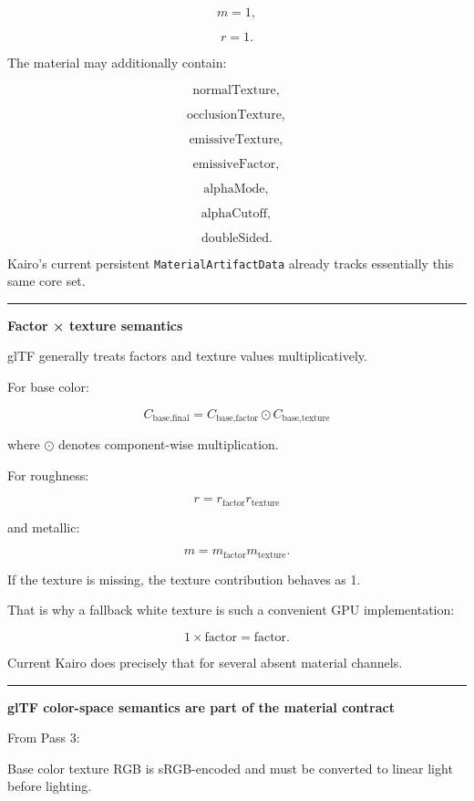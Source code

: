 \[
m=1,
\]

\[
r=1.
\]

The material may additionally contain:

\[
\text{normalTexture},
\]

\[
\text{occlusionTexture},
\]

\[
\text{emissiveTexture},
\]

\[
\text{emissiveFactor},
\]

\[
\text{alphaMode},
\]

\[
\text{alphaCutoff},
\]

\[
\text{doubleSided}.
\]

Kairo's current persistent \texttt{MaterialArtifactData} already tracks essentially this same core set.

\begin{center}\rule{0.5\linewidth}{0.5pt}\end{center}

\textbf{Factor × texture semantics}

glTF generally treats factors and texture values multiplicatively.

For base color:

\[
\boxed{
C_{\text{base,final}}
=
C_{\text{base,factor}}
\odot
C_{\text{base,texture}}
}
\]

where \(\odot\) denotes component-wise multiplication.

For roughness:

\[
\boxed{
r=
r_{\text{factor}}
r_{\text{texture}}
}
\]

and metallic:

\[
\boxed{
m=
m_{\text{factor}}
m_{\text{texture}}.
}
\]

If the texture is missing, the texture contribution behaves as 1.

That is why a fallback white texture is such a convenient GPU implementation:

\[
1\times\text{factor}
=
\text{factor}.
\]

Current Kairo does precisely that for several absent material channels.

\begin{center}\rule{0.5\linewidth}{0.5pt}\end{center}

\textbf{glTF color-space semantics are part of the material contract}

From Pass 3:

Base color texture RGB is sRGB-encoded and must be converted to linear light before lighting.

